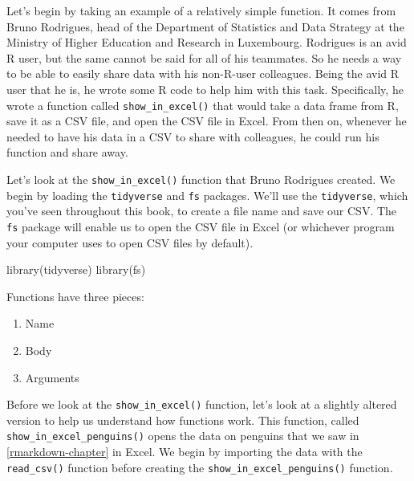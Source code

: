 \documentclass[
]{book}
\newenvironment{Shaded}{\begin{snugshade}}{\end{snugshade}}
\newcommand{\FunctionTok}[1]{\textcolor[rgb]{0.00,0.00,0.00}{#1}}
\newcommand{\NormalTok}[1]{#1}
\providecommand{\tightlist}{%
  \setlength{\itemsep}{0pt}\setlength{\parskip}{0pt}}
\begin{document}
Let's begin by taking an example of a relatively simple function. It comes from Bruno Rodrigues, head of the Department of Statistics and Data Strategy at the Ministry of Higher Education and Research in Luxembourg. Rodrigues is an avid R user, but the same cannot be said for all of his teammates. So he needs a way to be able to easily share data with his non-R-user colleagues. Being the avid R user that he is, he wrote some R code to help him with this task. Specifically, he wrote a function called \texttt{show\_in\_excel()} that would take a data frame from R, save it as a CSV file, and open the CSV file in Excel. From then on, whenever he needed to have his data in a CSV to share with colleagues, he could run his function and share away.

Let's look at the \texttt{show\_in\_excel()} function that Bruno Rodrigues created. We begin by loading the \texttt{tidyverse} and \texttt{fs} packages. We'll use the \texttt{tidyverse}, which you've seen throughout this book, to create a file name and save our CSV. The \texttt{fs} package will enable us to open the CSV file in Excel (or whichever program your computer uses to open CSV files by default).

\begin{Shaded}
\begin{Highlighting}[]
\FunctionTok{library}\NormalTok{(tidyverse)}
\FunctionTok{library}\NormalTok{(fs)}
\end{Highlighting}
\end{Shaded}

Functions have three pieces:

\begin{enumerate}
\def\labelenumi{\arabic{enumi}.}
\tightlist
\item
  Name
\item
  Body
\item
  Arguments
\end{enumerate}

Before we look at the \texttt{show\_in\_excel()} function, let's look at a slightly altered version to help us understand how functions work. This function, called \texttt{show\_in\_excel\_penguins()} opens the data on penguins that we saw in \ref{rmarkdown-chapter} in Excel. We begin by importing the data with the \texttt{read\_csv()} function before creating the \texttt{show\_in\_excel\_penguins()} function.
\end{document}
